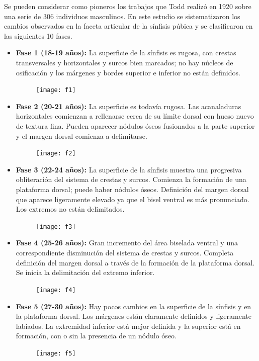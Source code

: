 \documentclass[a4paper,11pt]{article}
\begin{document}
Se pueden considerar como pioneros los trabajos que Todd realizó en 1920 sobre una serie de 306 individuos masculinos. En este estudio se sistematizaron los cambios observados en la faceta articular de la sínfisis púbica y se clasificaron en las siguientes 10 fases.
\begin{itemize}
\item {\bf Fase 1 (18-19 años):} La superficie de la sínfisis es rugosa, con crestas transversales y horizontales y surcos bien marcados; no hay núcleos de osificación y los márgenes y bordes superior e inferior no están definidos.
\begin{figure}[h!]
\centering
\texttt{[image: f1]}
\end{figure}
\item {\bf Fase 2 (20-21 años):} La superficie es todavía rugosa. Las acanaladuras horizontales comienzan a rellenarse cerca de su límite dorsal con hueso nuevo de textura fina. Pueden aparecer nódulos óseos fusionados a la parte superior y el margen dorsal comienza a delimitarse.
\begin{figure}[h!]
\centering
\texttt{[image: f2]}
\end{figure}
\item {\bf Fase 3 (22-24 años):} La superficie de la sínfisis muestra una progresiva obliteración del sistema de crestas y surcos. Comienza la formación de una plataforma dorsal; puede haber nódulos óseos. Definición del margen dorsal que aparece ligeramente elevado ya que el bisel ventral es más pronunciado. Los extremos no están delimitados.
\begin{figure}[h!]
\centering
\texttt{[image: f3]}
\end{figure}
\item {\bf Fase 4 (25-26 años):} Gran incremento del área biselada ventral y una correspondiente disminución del sistema de crestas y surcos. Completa definición del margen dorsal a través de la formación de la plataforma dorsal. Se inicia la delimitación del extremo inferior.
\begin{figure}[h!]
\centering
\texttt{[image: f4]}
\end{figure}
\item {\bf Fase 5 (27-30 años):} Hay pocos cambios en la superficie de la sínfisis y en la plataforma dorsal. Los márgenes están claramente definidos y ligeramente labiados. La extremidad inferior está mejor definida y la superior está en formación, con o sin la presencia de un nódulo óseo.
\begin{figure}[h!]
\centering
\texttt{[image: f5]}

\end{figure}
\end{itemize}
\end{document}
